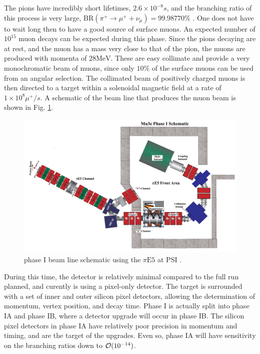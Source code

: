 \noindent The pions have incredibly short lifetimes, $2.6 \times 10^{-8}s$, and the branching ratio of this process is very large, $\textrm{BR}(\pi^+ \rightarrow \mu^+ + \nu_\mu) = 99.98770\%$ \cite{Agashe:2014kda}.
One does not have to wait long then to have a good source of surface muons.
An expected number of $10^{15}$ muon decays can be expected during this phase.
Since the pions decaying are at rest, and the muon has a mass very close to that of the pion, the muons are produced with momenta of $28\textrm{MeV}$.
These are easy collimate and provide a very monochromatic beam of muons, since only $10\%$ of the surface muons can be used from an angular selection.
The collimated beam of positively charged muons is then directed to a target within a solenoidal magnetic field at a rate of $1 \times 10^8 \mu^+/s$.
A schematic of the beam line that produces the muon beam is shown in Fig. \ref{fig:mu3e_phaseI_schematic}.

\begin{figure}[h]
    \centering
    \includegraphics[width = \textwidth]{Figures/experiments/mu3e_phase1_schematic.png}
    \caption{\mueee phase I beam line schematic using the $\pi\textrm{E5}$ at PSI \cite{Blondel:2013ia}.}
    \label{fig:mu3e_phaseI_schematic}
\end{figure}

During this time, the detector is relatively minimal compared to the full run planned, and curently is using a pixel-only detector.
The target is surrounded with a set of inner and outer silicon pixel detectors, allowing the determination of momentum, vertex position, and decay time.
Phase I is actually split into phase IA and phase IB, where a detector upgrade will occur in phase IB.
The silicon pixel detectors in phase IA have relatively poor precision in momentum and timing, and are the target of the upgrades.
Even so, phase IA will have sensitivity on the branching ratios down to $\operatorname{\mathcal{O}}(10^{-14})$.

